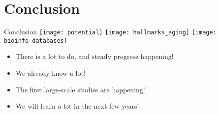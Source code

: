 \section{Conclusion}




\begin{frame}[c]{Conclusion}
    \texttt{[image: potential]}
    \texttt{[image: hallmarks\_aging]}
    \texttt{[image: bioinfo\_databases]} \\

    \large
    \begin{itemize}[<+(1)->]
        \item There is a lot to do, and steady progress happening!
        \item We already know a lot!
        \item The first large-scale studies are happening!
        \item We will learn a lot in the next few years!
    \end{itemize}
\end{frame}
